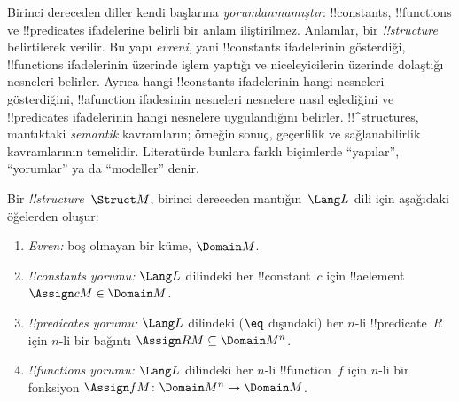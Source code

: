 \documentclass[../../../include/open-logic-section]{subfiles}
\begin{document}


\begin{explain}
Birinci dereceden diller kendi başlarına \emph{yorumlanmamıştır}:
!!{constant}s, !!{function}s ve !!{predicate}s ifadelerine belirli bir
anlam iliştirilmez. Anlamlar, bir 
\emph{!!{structure}} belirtilerek verilir. Bu yapı \emph{evreni}, yani
!!{constant}s ifadelerinin gösterdiği, !!{function}s ifadelerinin
üzerinde işlem yaptığı ve niceleyicilerin üzerinde dolaştığı nesneleri
belirler. Ayrıca hangi !!{constant}s ifadelerinin hangi nesneleri
gösterdiğini, !!a{function} ifadesinin nesneleri nesnelere nasıl
eşlediğini ve !!{predicate}s ifadelerinin hangi nesnelere uygulandığını
belirler. !!^{structure}s, mantıktaki \emph{semantik} kavramların;
örneğin sonuç, geçerlilik ve sağlanabilirlik kavramlarının temelidir.
Literatürde bunlara farklı biçimlerde ``yapılar'', ``yorumlar'' ya da
``modeller'' denir.
\end{explain}

\begin{defn}[!!^{structure}s]
Bir  \emph{!!{structure}}~$\Struct M$, birinci
dereceden mantığın~$\Lang L$ dili için aşağıdaki öğelerden oluşur:
\begin{enumerate}
\item \emph{Evren:} boş olmayan bir küme, $\Domain M$.
\item \emph{!!{constant}s yorumu:} $\Lang L$ dilindeki her
  !!{constant}~$c$ için !!a{element}~$\Assign cM\in\Domain M$.
\item \emph{!!{predicate}s yorumu:} $\Lang L$ dilindeki ($\eq$
  dışındaki) her $n$-li !!{predicate}~$R$ için $n$-li bir bağıntı
  $\Assign RM\subseteq\Domain M^n$.
\item \emph{!!{function}s yorumu:} $\Lang L$ dilindeki her $n$-li
  !!{function}~$f$ için $n$-li bir fonksiyon
  $\Assign fM\colon\Domain M^n\to\Domain M$.
\end{enumerate}
\end{defn}
\end{document}
